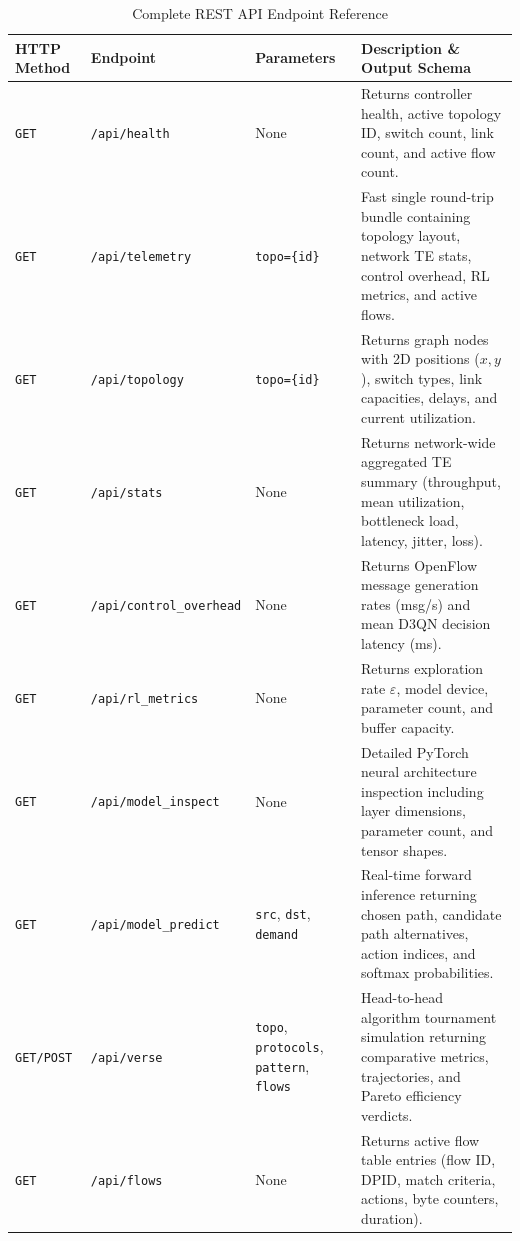 \begin{table}[htbp]
\centering
\caption{Complete REST API Endpoint Reference}
\label{tab:rest_api_reference}
\small
\begin{tabularx}{\textwidth}{l l p{4.2cm} X}
\toprule
\textbf{HTTP Method} & \textbf{Endpoint} & \textbf{Parameters} & \textbf{Description \& Output Schema} \\
\midrule
\texttt{GET} & \texttt{/api/health} & None & Returns controller health, active topology ID, switch count, link count, and active flow count. \\
\addlinespace
\texttt{GET} & \texttt{/api/telemetry} & \texttt{topo=\{id\}} & Fast single round-trip bundle containing topology layout, network TE stats, control overhead, RL metrics, and active flows. \\
\addlinespace
\texttt{GET} & \texttt{/api/topology} & \texttt{topo=\{id\}} & Returns graph nodes with 2D positions ($x, y$), switch types, link capacities, delays, and current utilization. \\
\addlinespace
\texttt{GET} & \texttt{/api/stats} & None & Returns network-wide aggregated TE summary (throughput, mean utilization, bottleneck load, latency, jitter, loss). \\
\addlinespace
\texttt{GET} & \texttt{/api/control\_overhead} & None & Returns OpenFlow message generation rates (msg/s) and mean D3QN decision latency (ms). \\
\addlinespace
\texttt{GET} & \texttt{/api/rl\_metrics} & None & Returns exploration rate $\varepsilon$, model device, parameter count, and buffer capacity. \\
\addlinespace
\texttt{GET} & \texttt{/api/model\_inspect} & None & Detailed PyTorch neural architecture inspection including layer dimensions, parameter count, and tensor shapes. \\
\addlinespace
\texttt{GET} & \texttt{/api/model\_predict} & \texttt{src}, \texttt{dst}, \texttt{demand} & Real-time forward inference returning chosen path, candidate path alternatives, action indices, and softmax probabilities. \\
\addlinespace
\texttt{GET/POST} & \texttt{/api/verse} & \texttt{topo}, \texttt{protocols}, \texttt{pattern}, \texttt{flows} & Head-to-head algorithm tournament simulation returning comparative metrics, trajectories, and Pareto efficiency verdicts. \\
\addlinespace
\texttt{GET} & \texttt{/api/flows} & None & Returns active flow table entries (flow ID, DPID, match criteria, actions, byte counters, duration). \\

\end{tabularx}
\end{table}
